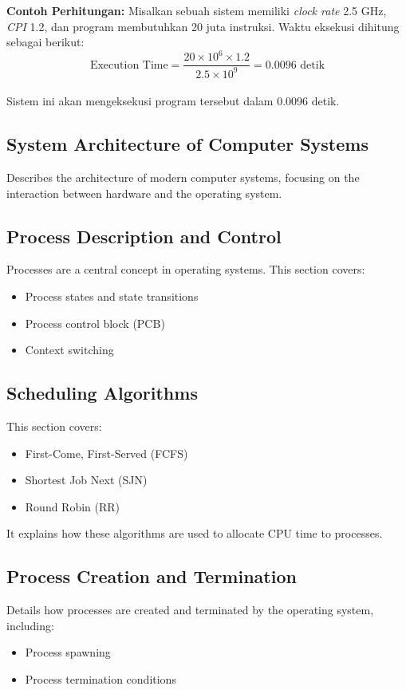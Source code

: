 \documentclass[12pt]{article}
\begin{document}
\textbf{Contoh Perhitungan:} Misalkan sebuah sistem memiliki \textit{clock rate} 2.5 GHz, \textit{CPI} 1.2, dan program membutuhkan 20 juta instruksi. Waktu eksekusi dihitung sebagai berikut:\\

\[
\text{Execution Time} = \frac{20 \times 10^6 \times 1.2}{2.5 \times 10^9} = 0.0096 \text{ detik}
\]\\

Sistem ini akan mengeksekusi program tersebut dalam 0.0096 detik.\\


\subsection{System Architecture of Computer Systems}
Describes the architecture of modern computer systems, focusing on the interaction between hardware and the operating system.

\subsection{Process Description and Control}
Processes are a central concept in operating systems. This section covers:
\begin{itemize}
    \item Process states and state transitions
    \item Process control block (PCB)
    \item Context switching
\end{itemize}

\subsection{Scheduling Algorithms}
This section covers:
\begin{itemize}
    \item First-Come, First-Served (FCFS)
    \item Shortest Job Next (SJN)
    \item Round Robin (RR)
\end{itemize}
It explains how these algorithms are used to allocate CPU time to processes.

\subsection{Process Creation and Termination}
Details how processes are created and terminated by the operating system, including:
\begin{itemize}
    \item Process spawning
    \item Process termination conditions
\end{itemize}
\end{document}
